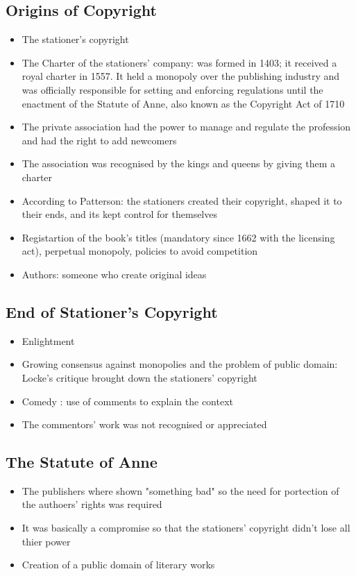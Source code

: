 \documentclass{article}
\begin{document}
\subsection{Origins of Copyright} 
\begin{itemize}
\item The stationer's copyright 
\item The Charter of the stationers' company: was formed in 1403; it received a royal charter in 1557. It held a monopoly over the publishing industry and was officially responsible for setting and enforcing regulations until the enactment of the Statute of Anne, also known as the Copyright Act of 1710
\item The private association had the power to manage and regulate the profession and had the right to add newcomers 
\item The association was recognised by the kings and queens by giving them a charter 
\item According to Patterson: the stationers created their copyright, shaped it to their ends, and its kept control for themselves 
\item Registartion of the book's titles (mandatory since 1662 with the licensing act), perpetual monopoly, policies to avoid competition
\item Authors: someone who create original ideas 
\end{itemize}

\subsection{End of Stationer's Copyright}
\begin{itemize}
\item Enlightment
\item Growing consensus against monopolies and the problem of public domain: Locke's critique brought down the stationers' copyright 
\item Comedy : use of comments to explain the context 
\item The commentors' work was not recognised or appreciated 
\end{itemize}

\subsection{The Statute of Anne}
\begin{itemize}
\item The publishers where shown "something bad" so the need for portection of the authoers' rights was required 
\item It was basically a compromise so that the stationers' copyright didn't lose all thier power 
\item Creation of a public domain of literary works 
\end{itemize}
\end{document}
